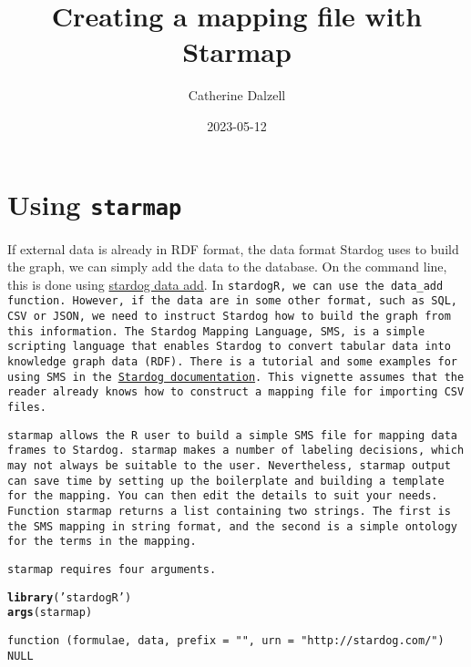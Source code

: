 \documentclass{article}\usepackage[]{graphicx}\usepackage[]{xcolor}
\title{Creating a mapping file with Starmap}
\author{Catherine Dalzell}
\date{2023-05-12}
\makeatletter
\newcommand{\hlstr}[1]{\textcolor[rgb]{0.192,0.494,0.8}{#1}}%
\newcommand{\hlstd}[1]{\textcolor[rgb]{0.345,0.345,0.345}{#1}}%
\newcommand{\hlkwd}[1]{\textcolor[rgb]{0.737,0.353,0.396}{\textbf{#1}}}%
\newenvironment{kframe}{%
 \def\at@end@of@kframe{}%
 \ifinner\ifhmode%
  \def\at@end@of@kframe{\end{minipage}}%
  \begin{minipage}{\columnwidth}%
 \fi\fi%
 \def\FrameCommand##1{\hskip\@totalleftmargin \hskip-\fboxsep
 \colorbox{shadecolor}{##1}\hskip-\fboxsep
     \hskip-\linewidth \hskip-\@totalleftmargin \hskip\columnwidth}%
 \MakeFramed {\advance\hsize-\width
   \@totalleftmargin\z@ \linewidth\hsize
   \@setminipage}}%
 {\par\unskip\endMakeFramed%
 \at@end@of@kframe}
\newenvironment{knitrout}{}{} %
\makeatother
\begin{document}
\maketitle

\tableofcontents

\section{Using \tt{starmap}}

If external data is already in RDF format, the data format Stardog uses to build the graph, we can simply add the data to the database. On the command line, this is done using \href{https://docs.stardog.com/stardog-cli-reference/data/data-add}{stardog data add}. In \tt{stardogR}, we can use the \tt{data\_add} function. However, if the data are in some other format, such as SQL, CSV or JSON, we need to instruct Stardog how to build the graph from this information. The Stardog Mapping Language, \tt{SMS}, is a simple scripting language that enables Stardog to convert tabular data into knowledge graph data (RDF). There is a tutorial and some examples for using SMS in the \href{https://docs.stardog.com/virtual-graphs/importing-json-csv-files}{Stardog documentation}. This vignette assumes that the reader already knows how to construct a mapping file for importing CSV files.

\tt{starmap} allows the R user to build a simple SMS file for mapping data frames to Stardog. \tt{starmap} makes a number of labeling decisions, which may not always be suitable to the user. Nevertheless, \tt{starmap} output can save time by setting up the boilerplate and building a template for the mapping. You can then edit the details to suit your needs. Function \tt{starmap} returns a list containing two strings. The first is the SMS mapping in string format, and the second is a simple ontology for the terms in the mapping.

\tt{starmap} requires four arguments.


\begin{knitrout}
\color{fgcolor}\begin{kframe}
\begin{alltt}
\hlkwd{library}\hlstd{(}\hlstr{'stardogR'}\hlstd{)}
\hlkwd{args}\hlstd{(starmap)}
\end{alltt}
\begin{verbatim}
function (formulae, data, prefix = "", urn = "http://stardog.com/") 
NULL
\end{verbatim}
\end{kframe}
\end{knitrout}
\end{document}
